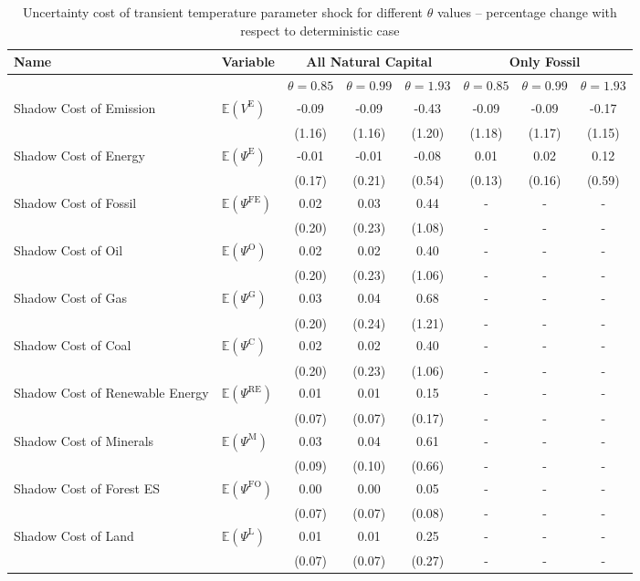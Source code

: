 \begin{table}[h!]
\centering
\begin{tabular}{l l c c c c c c}
\hline
Name & Variable & \multicolumn{3}{c}{All Natural Capital} & \multicolumn{3}{c}{Only Fossil} \\
\hline
 & & $\theta = 0.85$ & $\theta = 0.99$ & $\theta = 1.93$ & $\theta = 0.85$ & $\theta = 0.99$ & $\theta = 1.93$\\
\hline
Shadow Cost of Emission & $\mathbb{E}\!\left(V^{\text{E}}\right)$ & -0.09 & -0.09 & -0.43 & -0.09 & -0.09 & -0.17 \\
 & & (1.16) & (1.16) & (1.20) & (1.18) & (1.17) & (1.15) \\
Shadow Cost of Energy & $\mathbb{E}\!\left(\Psi^{\text{E}}\right)$ & -0.01 & -0.01 & -0.08 & 0.01 & 0.02 & 0.12 \\
 & & (0.17) & (0.21) & (0.54) & (0.13) & (0.16) & (0.59) \\
Shadow Cost of Fossil & $\mathbb{E}\!\left(\Psi^{\text{FE}}\right)$ & 0.02 & 0.03 & 0.44 & - & - & - \\
 & & (0.20) & (0.23) & (1.08) & - & - & - \\
Shadow Cost of Oil & $\mathbb{E}\!\left(\Psi^{\text{O}}\right)$ & 0.02 & 0.02 & 0.40 & - & - & - \\
 & & (0.20) & (0.23) & (1.06) & - & - & - \\
Shadow Cost of Gas & $\mathbb{E}\!\left(\Psi^{\text{G}}\right)$ & 0.03 & 0.04 & 0.68 & - & - & - \\
 & & (0.20) & (0.24) & (1.21) & - & - & - \\
Shadow Cost of Coal & $\mathbb{E}\!\left(\Psi^{\text{C}}\right)$ & 0.02 & 0.02 & 0.40 & - & - & - \\
 & & (0.20) & (0.23) & (1.06) & - & - & - \\
Shadow Cost of Renewable Energy & $\mathbb{E}\!\left(\Psi^{\text{RE}}\right)$ & 0.01 & 0.01 & 0.15 & - & - & - \\
 & & (0.07) & (0.07) & (0.17) & - & - & - \\
Shadow Cost of Minerals & $\mathbb{E}\!\left(\Psi^{\text{M}}\right)$ & 0.03 & 0.04 & 0.61 & - & - & - \\
 & & (0.09) & (0.10) & (0.66) & - & - & - \\
Shadow Cost of Forest ES & $\mathbb{E}\!\left(\Psi^{\text{FO}}\right)$ & 0.00 & 0.00 & 0.05 & - & - & - \\
 & & (0.07) & (0.07) & (0.08) & - & - & - \\
Shadow Cost of Land & $\mathbb{E}\!\left(\Psi^{\text{L}}\right)$ & 0.01 & 0.01 & 0.25 & - & - & - \\
 & & (0.07) & (0.07) & (0.27) & - & - & - \\
\hline
\end{tabular}
\caption{Uncertainty cost of transient temperature parameter shock for different $\theta$ values -- percentage change with respect to deterministic case}
\label{tab:paper_table34}
\end{table}
